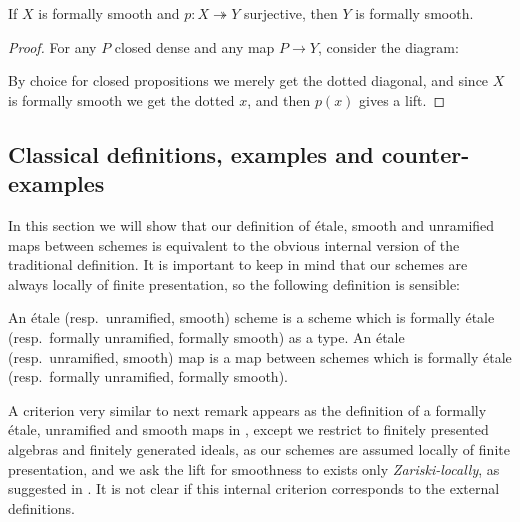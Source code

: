 \begin{proposition}\label{smoothSurjective}
If $X$ is formally smooth and $p:X\twoheadrightarrow Y$ surjective, then $Y$ is formally smooth.
\end{proposition}

\begin{proof}
For any $P$ closed dense and any map $P\to Y$, consider the diagram:
 \begin{center}
    \end{center} 
    By choice for closed propositions we merely get the dotted diagonal, and since $X$ is formally smooth we get the dotted $x$, and then $p(x)$ gives a lift.
\end{proof}


\subsection{Classical definitions, examples and counter-examples}

In this section we will show that our definition of étale, smooth and unramified maps between schemes is equivalent to the obvious internal version of the traditional definition. It is important to keep in mind that our schemes are always locally of finite presentation, so the following definition is sensible:

\begin{definition}
  An étale (resp.\ unramified, smooth) scheme is a scheme which is formally étale (resp.\ formally unramified, formally smooth) as a type.
  An étale (resp.\ unramified, smooth) map is a map between schemes which is formally étale (resp.\ formally unramified, formally smooth).
\end{definition}

A criterion very similar to next remark appears as the definition of a formally étale, unramified and smooth maps in \cite[§17]{EGAIV4},
except we restrict to finitely presented algebras and finitely generated ideals, as our schemes are assumed locally of finite presentation, and we ask the lift for smoothness to exists only \emph{Zariski-locally}, as suggested in \cite[\href{https://stacks.math.columbia.edu/tag/02GZ}{Tag 02GZ}]{stacks-project}.  It is not clear if this internal criterion corresponds to the external definitions.

